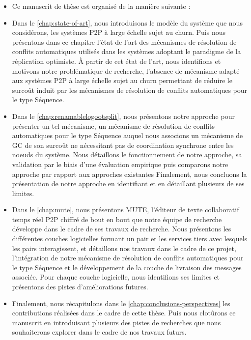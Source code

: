 \begin{itemize}
    \item Ce manuscrit de thèse est organisé de la manière suivante :
    \item Dans le \autoref{chap:state-of-art}, nous introduisons le modèle du système que nous considérons, \ie les systèmes \ac{P2P} à large échelle sujet au churn.
        Puis nous présentons dans ce chapitre l'état de l'art des mécanismes de résolution de conflits automatiques utilisés dans les systèmes adoptant le paradigme de la réplication optimiste.
        À partir de cet état de l'art, nous identifions et motivons notre problématique de recherche, \ie l'absence de mécanisme adapté aux systèmes \ac{P2P} à large échelle sujet au churn permettant de réduire le surcoût induit par les mécanismes de résolution de conflits automatiques pour le type Séquence.
    \item Dans le \autoref{chap:renamablelogootsplit}, nous présentons notre approche pour présenter un tel mécanisme, \ie un mécanisme de résolution de conflits automatiques pour le type Séquence auquel nous associons un mécanisme de \ac{GC} de son surcoût ne nécessitant pas de coordination synchrone entre les noeuds du système.
        Nous détaillons le fonctionnement de notre approche, sa validation par le biais d'une évaluation empirique puis comparons notre approche par rapport aux approches existantes
        Finalement, nous concluons la présentation de notre approche en identifiant et en détaillant plusieurs de ses limites.
    \item Dans le \autoref{chap:mute}, nous présentons \ac{MUTE}, l'éditeur de texte collaboratif temps réel \ac{P2P} chiffré de bout en bout que notre équipe de recherche développe dans le cadre de ses travaux de recherche.
        Nous présentons les différentes couches logicielles formant un pair et les services tiers avec lesquels les pairs interagissent, et détaillons nos travaux dans le cadre de ce projet, \ie l'intégration de notre mécanisme de résolution de conflits automatiques pour le type Séquence et le développement de la couche de livraison des messages associée.
        Pour chaque couche logicielle, nous identifions ses limites et présentons des pistes d'améliorations futures.
    \item Finalement, nous récapitulons dans le \autoref{chap:conclusions-perspectives} les contributions réalisées dans le cadre de cette thèse.
        Puis nous clotûrons ce manuscrit en introduisant plusieurs des pistes de recherches que nous souhaiterons explorer dans le cadre de nos travaux futurs.
\end{itemize}
